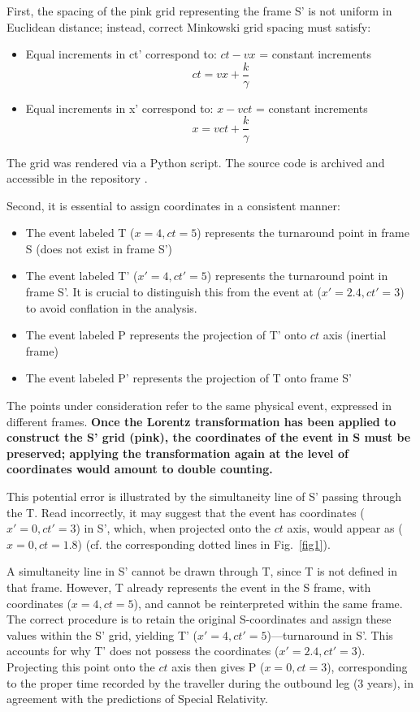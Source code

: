 \documentclass[pdflatex,sn-basic]{sn-jnl}
\theoremstyle{thmstyleone}%
\theoremstyle{thmstyletwo}%
\theoremstyle{thmstylethree}%
\begin{document}
  First, the spacing of the pink grid representing the frame S' is not uniform in Euclidean distance; instead, correct Minkowski grid spacing must satisfy:
		\begin{itemize}
			\item Equal increments in ct' correspond to: $ct-vx$ = constant increments
				\begin{equation*}
					ct = vx + \frac{k}{\gamma}
				\end{equation*}
			\item Equal increments in x' correspond to: $x-vct$ = constant increments
				\begin{equation*}
					x = vct + \frac{k}{\gamma}
				\end{equation*}
		\end{itemize}
The grid was rendered via a Python script. The source code is archived and accessible in the repository  \cite{time_duration_code2026}.

Second, it is essential to assign coordinates in a consistent manner:
		\begin{itemize}
			\item The event labeled T ($x = 4, ct = 5$) represents the turnaround point in frame S (does not exist in frame S')
			\item The event labeled T' ($x' = 4, ct'  = 5$) represents the turnaround point in frame S'. It is crucial to distinguish this from the event at ($x' = 2.4, ct' = 3$) to avoid conflation in the analysis.
			\item The event labeled P represents the projection of T' onto $ct$ axis (inertial frame)
			\item The event labeled P' represents the projection of T onto frame S'
		\end{itemize}
The points under consideration refer to the same physical event, expressed in different frames. \textbf{Once the Lorentz transformation has been applied to construct the S' grid (pink), the coordinates of the event in S must be preserved; applying the transformation again at the level of coordinates would amount to double counting.}

This potential error is illustrated by the simultaneity line of S' passing through the T. Read incorrectly, it may suggest that the event has coordinates ($x' = 0, ct' =3$) in S', which, when projected onto the $ct$ axis, would appear as ($x = 0, ct = 1.8$) (cf. the corresponding dotted lines in Fig.~\ref{fig1}). 

A simultaneity line in S' cannot be drawn through T, since T is not defined in that frame. However, T already represents the event in the S frame, with coordinates ($x = 4, ct = 5$), and cannot be reinterpreted within the same frame. The correct procedure is to retain the original S-coordinates and assign these values within the S' grid, yielding T' ($x' = 4, ct' = 5$)—turnaround in S'. This accounts for why T' does not possess the coordinates ($x' = 2.4, ct' = 3$). Projecting this point onto the $ct$ axis then gives P ($x = 0, ct = 3$), corresponding to the proper time recorded by the traveller during the outbound leg (3 years), in agreement with the predictions of Special Relativity.
\end{document}
